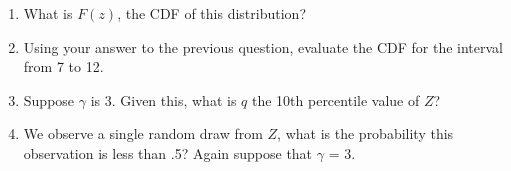 \documentclass[11pt]{article}
\begin{document}
\begin{enumerate}
\item What is $F(z)$, the CDF of this distribution?
\item Using your answer to the previous question, evaluate the CDF for the interval from 7 to 12. 
\item Suppose $\gamma$ is 3. Given this, what is $q$ the 10th percentile value of $Z$? 
\item We observe a single random draw from $Z$, what is the probability this observation is less than .5? Again suppose that $\gamma$ = 3. 
\end{enumerate}
\end{document}
